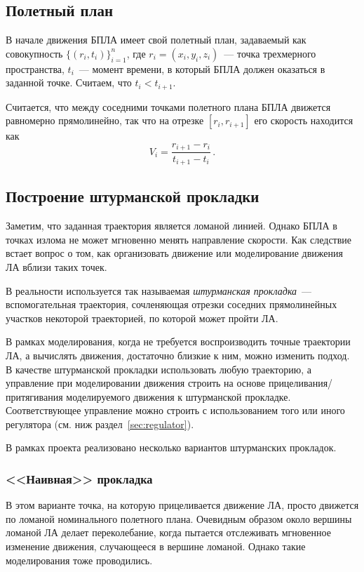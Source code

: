 \documentclass[a4paper,12pt]{article}
\begin{document}
\subsection{Полетный план}

В начале движения БПЛА имеет свой полетный план, задаваемый как совокупность $\{(r_i, t_i)\}_{i=1}^n$, где $r_i=(x_i,y_i,z_i)$~--- точка трехмерного пространства, $t_i$~--- момент времени, в который БПЛА должен оказаться в заданной точке. Считаем, что $t_i < t_{i+1}$.

Считается, что между соседними точками полетного плана БПЛА движется равномерно прямолинейно, так что на отрезке $[r_i,r_{i+1}]$ его скорость находится как
$$
  V_i = \frac{r_{i+1} - r_i}{t_{i+1} - t_i}\,.
$$

\subsection{Построение штурманской прокладки}

Заметим, что заданная траектория является ломаной линией. Однако БПЛА в точках излома не может мгновенно менять направление скорости. Как следствие встает вопрос о том, как организовать движение или моделирование движения ЛА вблизи таких точек.

В реальности используется так называемая \textit{штурманская прокладка}~--- вспомогательная траектория, сочленяющая отрезки соседних прямолинейных участков некоторой траекторией, по которой может пройти ЛА. 

В рамках моделирования, когда не требуется воспроизводить точные траектории ЛА, а вычислять движения, достаточно близкие к ним, можно изменить подход. В качестве штурманской прокладки использовать любую траекторию, а управление при моделировании движения строить на основе прицеливания/притягивания моделируемого движения к штурманской прокладке. Соответствующее управление можно строить с использованием того или иного регулятора (см. ниж раздел~\ref{sec:regulator}).

В рамках проекта реализовано несколько вариантов штурманских прокладок.

\subsubsection{<<Наивная>> прокладка}

В этом варианте точка, на которую прицеливается движение ЛА, просто движется по ломаной номинального полетного плана. Очевидным образом около вершины ломаной ЛА делает переколебание, когда пытается отслеживать мгновенное изменение движения, случающееся в вершине ломаной. Однако такие моделирования тоже проводились.
\end{document}
